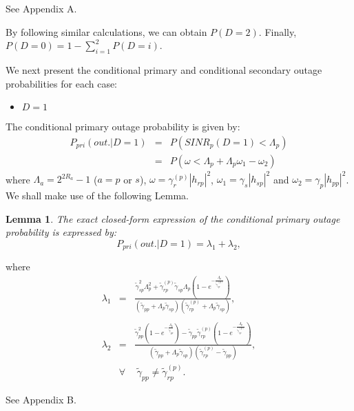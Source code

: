\documentclass[conference,twocolumn]{IEEEtran}
\newtheorem{Lemma}{Lemma}
\begin{document}
\begin{IEEEproof}
See Appendix A.
\end{IEEEproof}
By following similar calculations, we can obtain $P(D=2)$.
Finally, $P(D=0)=1-\sum\limits_{i=1}^{2}P(D=i)$.

We next present the conditional primary and conditional secondary outage probabilities for each case:
\begin{itemize}
  \item $D=1$
\end{itemize}
The conditional primary outage probability is given by:
\begin{eqnarray}
\label{eq:outage_prob_CR_help_PU_D1_0}
\nonumber P_{pri}(out.|D=1)&=&P\left( SINR_{p}(D=1)<\Lambda_p \right)\\
 &=&P(\omega<\Lambda_p+\Lambda_p \omega_1 - \omega_2)
\end{eqnarray}
where $\Lambda_a=2^{2R_a}-1$ ($a=p$ or $s$),
$\omega=\gamma_{r}^{(p)}|h_{rp}|^2$, $\omega_1=\gamma_{s}|h_{sp}|^2$ and
$\omega_2=\gamma_{p}|h_{pp}|^2$. We shall make use of the
following Lemma.
\begin{Lemma}
The exact closed-form expression of the conditional primary outage probability is expressed by:
\label{Lemma1}
\begin{equation}
\label{eq:outage_prob_CR_help_PU_D1} P_{pri}(out.|D=1)=\lambda_1+\lambda_2,
\end{equation}
\end{Lemma}
where
\begin{eqnarray}
\label{eq:d1}
\nonumber \lambda_1&=&\frac{\tilde{{\gamma}}_{sp}^2\Lambda_p^2
+\tilde{{\gamma}}_{rp}^{(p)}\tilde{{\gamma}}_{sp}\Lambda_p\left( 1-e^{-\frac{\Lambda_p}{\tilde{\gamma}_{rp}^{(p)}}} \right) }{(\tilde{{\gamma}}_{pp}+\Lambda_p
\tilde{{\gamma}}_{sp})(\tilde{{\gamma}}_{rp}^{(p)}+\Lambda_p \tilde{{\gamma}}_{sp})},\\
\\
\nonumber \lambda_2&=&\frac{\tilde{\gamma}_{pp}^2 \left( 1-e^{-\frac{\Lambda_p}{\tilde{\gamma}_{pp}}} \right)-\tilde{\gamma}_{pp} \tilde{\gamma}_{rp}^{(p)} \left( 1-e^{-\frac{\Lambda_p}{\tilde{\gamma}_{rp}^{(p)}}} \right) }{(\tilde{{\gamma}}_{pp}+\Lambda_p
\tilde{{\gamma}}_{sp})(\tilde{{\gamma}}_{rp}^{(p)}-\tilde{{\gamma}}_{pp})},\\
\label{eq:d2} &\forall&\; \tilde{{\gamma}}_{pp} \neq
\tilde{{\gamma}}_{rp}^{(p)}.
\end{eqnarray}
\begin{IEEEproof} See Appendix B.
\end{IEEEproof}
\end{document}
